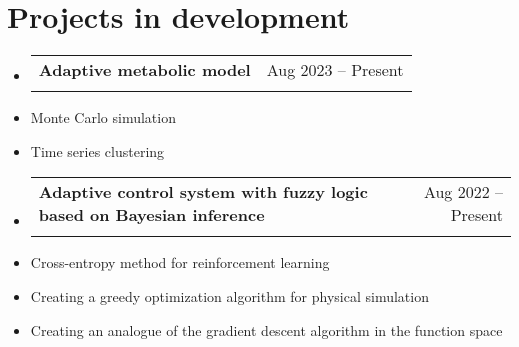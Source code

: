 \documentclass[a4paper,11pt]{article}
\makeatletter
\newcommand{\resumeItem}[1]{
  \item\small{#1}
}
\newcommand{\resumeItemListStart}{\begin{itemize}[rightmargin=0.11in]}
\newcommand{\resumeItemListEnd}{\end{itemize}}
\newcommand{\resumeQuadHeading}[4]{
  \item
  \begin{tabular*}{0.96\textwidth}[t]{l@{\extracolsep{\fill}}r}
    \textbf{#1} & #2 \\
    \textit{\small#3} & \textit{\small #4} \\
  \end{tabular*}
}
\newcommand{\resumeHeadingListStart}{
  \begin{itemize}[leftmargin=0.15in, label={}]
}
\newcommand{\resumeHeadingListEnd}{\end{itemize}}
\makeatother
\begin{document}

\section{Projects in development}  

\resumeHeadingListStart{}
\resumeQuadHeading{Adaptive metabolic model}{Aug 2023 -- Present}{}{}
\resumeHeadingListEnd

\resumeItemListStart{}
\resumeItem{Monte Carlo simulation}
\resumeItem{Time series clustering}
\resumeItemListEnd

\resumeHeadingListStart{}
\resumeQuadHeading{Adaptive control system with fuzzy logic based on Bayesian inference}{Aug 2022 -- Present}{}{}
\resumeHeadingListEnd

\resumeItemListStart{}
\resumeItem{Cross-entropy method for reinforcement learning}
\resumeItem{Creating a greedy optimization algorithm for physical simulation}
\resumeItem{Creating an analogue of the gradient descent algorithm in the function space}
\resumeItemListEnd{}
\end{document}
